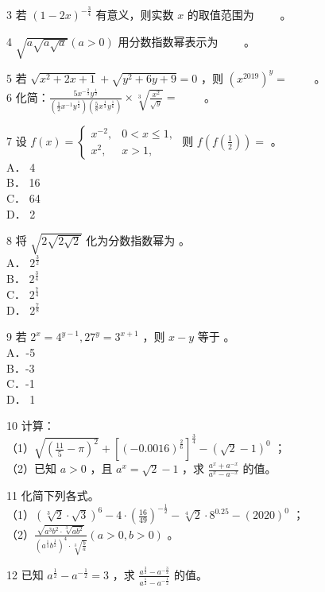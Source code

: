 \documentclass[10pt]{article}
\begin{document}
3 若 \((1-2 x)^{-\frac{3}{4}}\) 有意义，则实数 \(x\) 的取值范围为 \(\qquad\)。

4 \(\sqrt{a \sqrt{a \sqrt{a}}}(a>0)\) 用分数指数幂表示为 \(\qquad\)。

5 若 \(\sqrt{x^{2}+2 x+1}+\sqrt{y^{2}+6 y+9}=0\) ，则 \(\left(x^{2019}\right)^{y}=\) \(\qquad\)。\\
6 化简：\(\frac{5 x^{-\frac{2}{3}} y^{\frac{1}{2}}}{\left(\frac{1}{2} x^{-1} y^{\frac{1}{2}}\right)\left(\frac{5}{8} x^{\frac{1}{3}} y^{\frac{1}{6}}\right)} \times \sqrt[3]{\frac{x^{2}}{\sqrt{y}}}=\) \(\qquad\)。

7 设 \(f(x)=\left\{\begin{array}{ll}x^{-2}, & 0<x \leqslant 1, \\ x^{2}, & x>1,\end{array}\right.\) 则 \(f\left(f\left(\frac{1}{2}\right)\right)=\) 。\\
A． 4\\
B． 16\\
C． 64\\
D． 2

8 将 \(\sqrt{2 \sqrt{2 \sqrt{2}}}\) 化为分数指数幂为 。\\
A． \(2^{\frac{3}{2}}\)\\
B． \(2^{\frac{3}{4}}\)\\
C． \(2^{\frac{7}{4}}\)\\
D． \(2^{\frac{7}{8}}\)

9 若 \(2^{x}=4^{y-1}, 27^{y}=3^{x+1}\) ，则 \(x-y\) 等于 。\\
A．-5\\
B．-3\\
C．-1\\
D． 1

10 计算：\\
（1）\(\sqrt{\left(\frac{11}{5}-\pi\right)^{2}}+\left[(-0.0016)^{\frac{2}{6}}\right]^{\frac{3}{4}}-(\sqrt{2}-1)^{0}\) ；\\
（2）已知 \(a>0\) ，且 \(a^{x}=\sqrt{2}-1\) ，求 \(\frac{a^{x}+a^{-x}}{a^{x}-a^{-x}}\) 的值。

11 化简下列各式。\\
（1）\((\sqrt[3]{2} \cdot \sqrt{3})^{6}-4 \cdot\left(\frac{16}{49}\right)^{-\frac{1}{2}}-\sqrt[4]{2} \cdot 8^{0.25}-(2020)^{0}\) ；\\
（2）\(\frac{\sqrt{a^{3} b^{2} \cdot \sqrt[3]{a b^{2}}}}{\left(a^{\frac{1}{4}} b^{\frac{1}{2}}\right)^{4} \cdot \sqrt[3]{\frac{b}{a}}}(a>0, b>0)\) 。

12 已知 \(a^{\frac{1}{2}}-a^{-\frac{1}{2}}=3\) ，求 \(\frac{a^{\frac{3}{2}}-a^{-\frac{3}{2}}}{a^{\frac{1}{2}}-a^{-\frac{1}{2}}}\) 的值。
\end{document}
